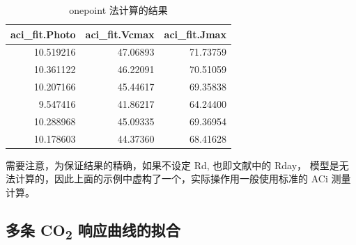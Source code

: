 \documentclass[]{krantz}
\makeatletter
\newenvironment{Shaded}{\begin{snugshade}}{\end{snugshade}}
\newcommand{\KeywordTok}[1]{\textcolor[rgb]{0.13,0.29,0.53}{\textbf{#1}}}
\newcommand{\DataTypeTok}[1]{\textcolor[rgb]{0.13,0.29,0.53}{#1}}
\newcommand{\DecValTok}[1]{\textcolor[rgb]{0.00,0.00,0.81}{#1}}
\newcommand{\FloatTok}[1]{\textcolor[rgb]{0.00,0.00,0.81}{#1}}
\newcommand{\StringTok}[1]{\textcolor[rgb]{0.31,0.60,0.02}{#1}}
\newcommand{\OtherTok}[1]{\textcolor[rgb]{0.56,0.35,0.01}{#1}}
\newcommand{\OperatorTok}[1]{\textcolor[rgb]{0.81,0.36,0.00}{\textbf{#1}}}
\newcommand{\NormalTok}[1]{#1}
\newenvironment{kframe}{%
\medskip{}
\setlength{\fboxsep}{.8em}
 \def\at@end@of@kframe{}%
 \ifinner\ifhmode%
  \def\at@end@of@kframe{\end{minipage}}%
  \begin{minipage}{\columnwidth}%
 \fi\fi%
 \def\FrameCommand##1{\hskip\@totalleftmargin \hskip-\fboxsep
 \colorbox{shadecolor}{##1}\hskip-\fboxsep
     \hskip-\linewidth \hskip-\@totalleftmargin \hskip\columnwidth}%
 \MakeFramed {\advance\hsize-\width
   \@totalleftmargin\z@ \linewidth\hsize
   \@setminipage}}%
 {\par\unskip\endMakeFramed%
 \at@end@of@kframe}
\renewenvironment{Shaded}{\begin{kframe}}{\end{kframe}}
\theoremstyle{definition}
\theoremstyle{definition}
\theoremstyle{definition}
\theoremstyle{remark}
\makeatother
\begin{document}
\begin{Shaded}
\end{Shaded}

\begin{table}

\caption{\label{tab:onepoint}onepoint 法计算的结果}
\centering
\begin{tabular}[t]{rrr}
\toprule
aci\_fit.Photo & aci\_fit.Vcmax & aci\_fit.Jmax\\
\midrule
10.519216 & 47.06893 & 71.73759\\
10.361122 & 46.22091 & 70.51059\\
10.207166 & 45.44617 & 69.35838\\
9.547416 & 41.86217 & 64.24400\\
10.288968 & 45.09335 & 69.36954\\
10.178603 & 44.37360 & 68.41628\\
\bottomrule
\end{tabular}
\end{table}

需要注意，为保证结果的精确，如果不设定 Rd, 也即文献中的 Rday，
模型是无法计算的，因此上面的示例中虚构了一个，实际操作用一般使用标准的
ACi 测量计算。

\subsection{\texorpdfstring{多条 CO\textsubscript{2}
响应曲线的拟合}{多条 CO2 响应曲线的拟合}}\label{multi_curve}
\end{document}
